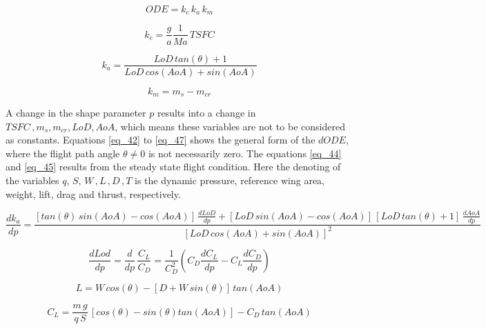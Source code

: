 \begin{equation}
    \label{eq_38}
    ODE = k_c \, k_a \, k_{m}
\end{equation}

\begin{equation}
    \label{eq_39}
    k_c  = \frac{g}{a} \frac{1}{Ma} \, TSFC
\end{equation}

\begin{equation}
    \label{eq_40}
    k_a  = \frac{LoD \, tan(\theta) +1 }{LoD \, cos(AoA) + sin(AoA)}
\end{equation}

\begin{equation}
    \label{eq_41}
    k_m  = m_s - m_{cr}
\end{equation}

A change in the shape parameter $p$ results 
into a change in $TSFC\,, m_s, m_{cr}, LoD, AoA$, which 
means these variables are not to be considered as constants.
Equations \eqref{eq_42} to \eqref{eq_47} shows 
the general form of the $dODE$, where 
the flight path angle $\theta \neq 0$ is not 
necessarily zero. The equations \eqref{eq_44}
and \eqref{eq_45} results from 
the steady state flight condition. Here 
the denoting of the variables 
$q,\, S,\, W\,, L\,, D \, , T$ is the dynamic pressure,
reference wing area, weight, lift, drag and thrust, 
respectively.


\begin{equation}
    \label{eq_42}
    \frac{dk_a}{dp} = \frac{[ tan(\theta) \, sin(AoA) - cos(AoA)]
    \,\frac{dLoD}{dp} + [LoD \,sin(AoA) - cos (AoA)] 
    \,[LoD \, tan(\theta) + 1] \, \frac{dAoA}{dp} }
    {[LoD \, cos(AoA) + sin (AoA)]^{2}}
\end{equation}


\begin{equation}
    \label{eq_43}
    \frac{dLod}{dp} = \frac{d}{dp} \, \frac{C_L}{C_D} = 
    \frac{1}{C_{D}^{2}} \left(C_D  \frac{dC_L}{dp} - 
    C_L \frac{dC_D}{dp}  \right)
\end{equation}


\begin{equation}
    \label{eq_44}
    L = W \,cos(\theta) - [D + W \, sin(\theta)]\, tan(AoA)
\end{equation}

\begin{equation}
    \label{eq_45}
    C_L = \frac{m\, g}{q \, S}\,[cos(\theta) - sin(\theta) tan(AoA)] -
     C_D \, tan(AoA)
\end{equation}

